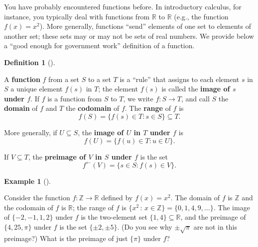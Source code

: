 \documentclass[10pt,]{book}
\newcommand{\terminology}[1]{\textbf{#1}}
\theoremstyle{plain}
\theoremstyle{definition}
\newtheorem{definition}[theorem]{Definition}
\theoremstyle{definition}
\theoremstyle{definition}
\newtheorem{example}[theorem]{Example}
\theoremstyle{definition}
\numberwithin{equation}{section}
\def\Z{\mathbb{Z}}
\def\R{\mathbb{R}}
\begin{document}
    You have probably encountered functions before. In introductory
    calculus, for instance, you typically deal with functions from
    \(\R\) to \(\R\) (e.g., the function \(f(x)=x^2\)). More generally,
    functions ``send'' elements of one set to elements of another set;
    these sets may or may not be sets of real numbers. We provide below
    a ``good enough for government work'' definition of a function.
\begin{definition}[{}]\label{definition-8}

        A \terminology{function} \(f\) from a set \(S\) to a set \(T\) is a
        ``rule'' that assigns to each element \(s\) in \(S\) a unique
        element \(f(s)\) in \(T\); the element \(f(s)\) is called the \terminology{image of \(s\) under \(f\)}. If \(f\) is a function from \(S\) to \(T\),
        we write \(f: S \to T\), and call \(S\) the \terminology{domain} of \(f\) and
        \(T\) the \terminology{codomain} of \(f\). The \terminology{range} of \(f\) is
\begin{equation*}
f(S)=\{f(s) \in T : s \in S\} \subseteq T.
\end{equation*}

\par

        More generally, if \(U \subseteq S\), the \terminology{image of \(U\) in \(T\) under \(f\)} is
\begin{equation*}
f(U)=\{f(u)\in T : u\in U\}.
\end{equation*}

\par

        If \(V\subseteq T\), the \terminology{preimage of \(V\) in \(S\) under \(f\)} is the set
\begin{equation*}
f^{\leftarrow}(V)=\{s\in S: f(s)\in V\}.
\end{equation*}

\label{notation-23}
\label{notation-24}
\label{notation-25}
\end{definition}
\begin{example}[]\label{example-5}

        Consider the function \(f: \Z \to \R\) defined by \(f(x)=x^2\).
        The domain of \(f\) is \(\Z\) and the codomain of \(f\) is \(\R\); the
        range of \(f\) is \(\{x^2\,:\,x\in \Z\}=\{0,1,4,9,\ldots\}\). The image
        of \(\{-2,-1,1,2\}\) under \(f\) is the two-element set \(\{1,4\} \subseteq
        \R\), and the preimage of \(\{4,25,\pi\}\) under \(f\) is the set
        \(\{\pm 2, \pm 5\}\). (Do you see why \(\pm \sqrt{\pi}\) are not in this
        preimage?) What is the preimage of just \(\{\pi\}\) under \(f\)?
\end{example}
\par
\end{document}
